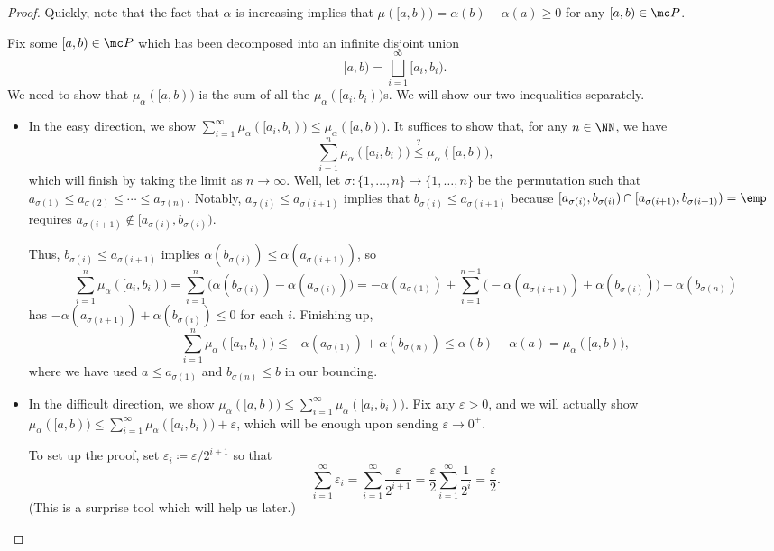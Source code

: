 \documentclass[../notes.tex]{subfiles}
\begin{document}
\begin{proof}
	Quickly, note that the fact that $\alpha$ is increasing implies that $\mu([a,b))=\alpha(b)-\alpha(a)\ge0$ for any $[a,b)\in\mc P$.
	
	Fix some $[a,b)\in\mc P$ which has been decomposed into an infinite disjoint union
	\[[a,b)=\bigsqcup_{i=1}^\infty[a_i,b_i).\]
	We need to show that $\mu_\alpha([a,b))$ is the sum of all the $\mu_\alpha([a_i,b_i))$s. We will show our two inequalities separately.
	\begin{itemize}
		\item In the easy direction, we show $\sum_{i=1}^\infty\mu_\alpha([a_i,b_i))\le\mu_\alpha([a,b))$. It suffices to show that, for any $n\in\NN$, we have
		\[\sum_{i=1}^n\mu_\alpha([a_i,b_i))\stackrel?\le\mu_\alpha([a,b)),\]
		which will finish by taking the limit as $n\to\infty$. Well, let $\sigma\colon\{1,\ldots,n\}\to\{1,\ldots,n\}$ be the permutation such that $a_{\sigma(1)}\le a_{\sigma(2)}\le\cdots\le a_{\sigma(n)}$. Notably, $a_{\sigma(i)}\le a_{\sigma(i+1)}$ implies that $b_{\sigma(i)}\le a_{\sigma(i+1)}$ because $[a_{\sigma(i)},b_{\sigma(i)})\cap[a_{\sigma(i+1)},b_{\sigma(i+1)})=\emp$ requires $a_{\sigma(i+1)}\notin[a_{\sigma(i)},b_{\sigma(i)})$.

		Thus, $b_{\sigma(i)}\le a_{\sigma(i+1)}$ implies $\alpha(b_{\sigma(i)})\le\alpha(a_{\sigma(i+1)})$, so
		\[\sum_{i=1}^n\mu_\alpha([a_i,b_i))=\sum_{i=1}^n\big(\alpha(b_{\sigma(i)})-\alpha(a_{\sigma(i)})\big)=-\alpha(a_{\sigma(1)})+\sum_{i=1}^{n-1}\big(-\alpha(a_{\sigma(i+1)})+\alpha(b_{\sigma(i)})\big)+\alpha(b_{\sigma(n)})\]
		has $-\alpha(a_{\sigma(i+1)})+\alpha(b_{\sigma(i)})\le0$ for each $i$. Finishing up,
		\[\sum_{i=1}^n\mu_\alpha([a_i,b_i))\le-\alpha(a_{\sigma(1)})+\alpha(b_{\sigma(n)})\le\alpha(b)-\alpha(a)=\mu_\alpha([a,b)),\]
		where we have used $a\le a_{\sigma(1)}$ and $b_{\sigma(n)}\le b$ in our bounding.
		\item In the difficult direction, we show $\mu_\alpha([a,b))\le\sum_{i=1}^\infty\mu_\alpha([a_i,b_i))$. Fix any $\varepsilon>0$, and we will actually show $\mu_\alpha([a,b))\le\sum_{i=1}^\infty\mu_\alpha([a_i,b_i))+\varepsilon$, which will be enough upon sending $\varepsilon\to0^+$.

		To set up the proof, set $\varepsilon_i\coloneqq\varepsilon/2^{i+1}$ so that
		\[\sum_{i=1}^\infty\varepsilon_i=\sum_{i=1}^\infty\frac\varepsilon{2^{i+1}}=\frac\varepsilon2\sum_{i=1}^\infty\frac1{2^i}=\frac\varepsilon2.\]
		(This is a surprise tool which will help us later.)


\end{itemize}
\end{proof}
\end{document}
